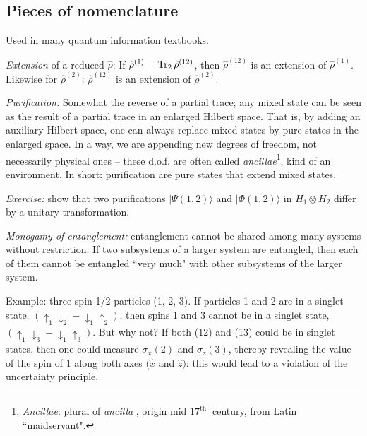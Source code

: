 \documentclass[12pt]{article}
\begin{document}

\subsection{Pieces of nomenclature}

Used in many quantum information textbooks.

\emph{Extension} of a reduced \(\hat{\rho}\): If \(\hat{\rho}^{(1)}=\Tr_{2} \hat{\rho}^{(12)}\), then \(\hat{\rho}^{(12)}\) is an extension
of \(\hat{\rho}^{(1)}\). Likewise for \(\hat{\rho}^{(2)}\): \(\hat{\rho}^{(12)}\) is an extension of \(\hat{\rho}^{(2)}\).


\emph{Purification:} Somewhat the reverse of a partial trace;
any mixed state can be seen as the result
of a partial trace in an enlarged Hilbert space.
That is, by adding an auxiliary Hilbert space,
one can always replace mixed states
by pure states in the enlarged space.
In a way, we are appending new degrees of
freedom, not necessarily physical ones
-- these \mbox{d.o.f.} are often called \emph{ancillae}\footnote{%
\textit{Ancillae}: plural of \textit{ancilla} , origin mid \(17^{\text {th }}\) century,
from Latin ``maidservant".%
},
kind of an environment.
In short: purification are pure states that extend mixed states.


\emph{Exercise:} show that two purifications \(|\Psi(1,2)\rangle\) and
\(|\Phi(1,2)\rangle\) in \(H_{1} \otimes H_{2}\) differ by a unitary
transformation.

\emph{Monogamy of entanglement:} entanglement cannot be shared among many systems without restriction.
If two subsystems of a larger system are
entangled, then each of them cannot be
entangled ``very much" with other subsystems
of the larger system.

Example: three spin-1/2 particles (1, 2, 3).
If particles 1 and 2 are in a singlet state,
\(\left(\uparrow_{1} \downarrow_{2}-\downarrow_{1} \uparrow_{2}\right)\), 
then spins 1 and 3 cannot be in a singlet state, 
\(\left(\uparrow_{1} \downarrow_{3}-\downarrow_{1} \uparrow_{3}\right)\).
But why not?
If both (12) and (13) could be
in singlet states, then one could
measure \(\sigma_{x}(2)\) and \(\sigma_{z}(3)\), thereby
revealing the value of the spin of 1
along both axes \((\hat{x}\) and \(\hat{z})\):
this would lead to a violation of the uncertainty principle.
\end{document}
